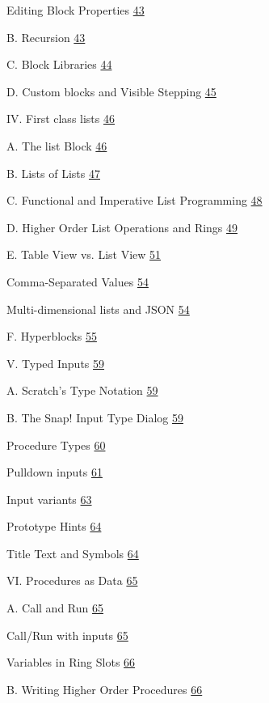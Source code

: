 Editing Block Properties \hyperref[editing-block-properties]{43}

B. Recursion \hyperref[recursion]{43}

C. Block Libraries \hyperref[block-libraries]{44}

D. Custom blocks and Visible Stepping
\hyperref[custom-blocks-and-visible-stepping]{45}

IV. First class lists \hyperref[first-class-lists]{46}

A. The list Block \hyperref[the-list-block]{46}

B. Lists of Lists \hyperref[lists-of-lists]{47}

C. Functional and Imperative List Programming
\hyperref[functional-and-imperative-list-programming]{48}

D. Higher Order List Operations and Rings
\hyperref[higher-order-list-operations-and-rings]{49}

E. Table View vs. List View \hyperref[table-view-vs.-list-view]{51}

Comma-Separated Values \hyperref[comma-separated-values]{54}

Multi-dimensional lists and JSON
\hyperref[multi-dimensional-lists-and-json]{54}

F. Hyperblocks \hyperref[hyperblocks]{55}

V. Typed Inputs \hyperref[typed-inputs]{59}

A. Scratch's Type Notation \hyperref[scratchs-type-notation]{59}

B. The Snap! Input Type Dialog \hyperref[the-snap-input-type-dialog]{59}

Procedure Types \hyperref[procedure-types]{60}

Pulldown inputs
\hyperref[macintosh-hdusersbhdesktopgear-part.pngpulldown-inputs]{61}

Input variants \hyperref[input-variants]{63}

Prototype Hints \hyperref[prototype-hints]{64}

Title Text and Symbols \hyperref[title-text-and-symbols]{64}

VI. Procedures as Data \hyperref[procedures-as-data]{65}

A. Call and Run \hyperref[call-and-run]{65}

Call/Run with inputs \hyperref[callrun-with-inputs]{65}

Variables in Ring Slots \hyperref[variables-in-ring-slots]{66}

B. Writing Higher Order Procedures
\hyperref[writing-higher-order-procedures]{66}


